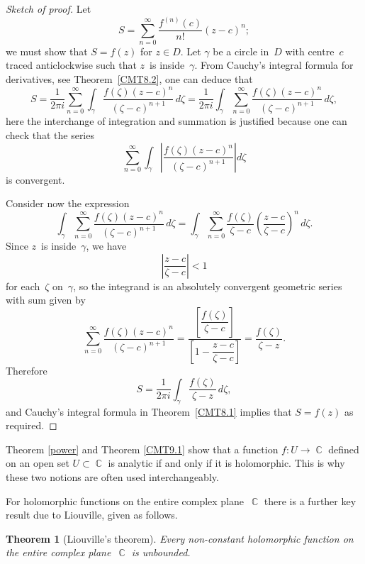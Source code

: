 \documentclass{amsproc}
\newtheorem{theorem}{Theorem}[subsection]
\theoremstyle{definition}
\theoremstyle{remark}
\DeclareMathOperator{\C}{\mathbb{C}}
\numberwithin{equation}{section}
\begin{document}
\begin{proof}[Sketch of proof]
Let
$$
S = \sum_{n = 0}^\infty \dfrac{f^{(n)}(c)}{n!}(z - c)^n;
$$
we must show that $ S = f(z) $ for $ z \in D $. Let $ \gamma $ be a circle
in~$ D $ with centre~$ c $ traced anticlockwise such that $ z $~is inside~$ \gamma $. From Cauchy's integral
formula for derivatives, see Theorem~\ref{CMT8.2}, one can deduce that
$$
S = \dfrac{1}{2\pi i} \sum_{n = 0}^\infty \int_\gamma \dfrac{f(\zeta)(z - c)^n}{(\zeta - c)^{n + 1}}\,d\zeta
= \dfrac{1}{2\pi i} \int_\gamma \sum_{n = 0}^\infty \dfrac{f(\zeta)(z - c)^n}{(\zeta - c)^{n + 1}}\,d\zeta,
$$
here the interchange of integration and summation is justified because one can check that the series
$$
\sum_{n = 0}^\infty \int_\gamma \left|\dfrac{f(\zeta)(z - c)^n}{(\zeta - c)^{n + 1}}\right| d\zeta
$$
is convergent.

Consider now the expression
$$
\int_\gamma \sum_{n = 0}^\infty \dfrac{f(\zeta)(z - c)^n}{(\zeta - c)^{n + 1}}\,d\zeta = \int_\gamma \sum_{n = 0}^\infty \dfrac{f(\zeta)}{\zeta - c}
\left(\dfrac{z - c}{\zeta - c}\right)^n\,d\zeta.
$$
Since $ z $~is inside~$ \gamma $, we have
$$
\left|\dfrac{z - c}{\zeta - c}\right| < 1
$$
for each~$ \zeta $ on~$ \gamma $, so the integrand is an absolutely convergent geometric series with sum given by
$$
\sum_{n = 0}^\infty \dfrac{f(\zeta)(z - c)^n}{(\zeta - c)^{n + 1}}
= \dfrac{\left[\dfrac{f(\zeta)}{\zeta - c}\right]}{\left[1 - \dfrac{z - c}{\zeta - c}\right]}
= \dfrac{f(\zeta)}{\zeta - z}.
$$
Therefore
$$
S = \dfrac{1}{2\pi i} \int_\gamma \dfrac{f(\zeta)}{\zeta - z}\,d\zeta,
$$
and Cauchy's integral formula in Theorem~\ref{CMT8.1} implies that $ S = f(z) $ as required.
\end{proof}

Theorem \ref{power} and Theorem \ref{CMT9.1} show that a function $ f: U \to \C $ defined on an open set $ U \subset \C $ is analytic if and only if it is holomorphic.
This is why these two notions are often used interchangeably.

For holomorphic functions on the entire complex plane~$ \C $ there is a further key result due to Liouville, given as follows.

\begin{theorem}[Liouville's theorem] \label{CMT9.2}
Every non-constant holomorphic function on the entire complex plane~$ \C $ is unbounded.
\end{theorem}
\end{document}
